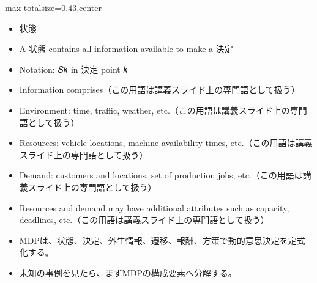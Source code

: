 \clearpage
{}
\begin{minipage}[t]{0.405\textwidth}
\begin{adjustbox}{max totalsize={\textwidth}{0.43\textheight},center}
\begin{minipage}{\textwidth}\scriptsize
{}\begin{itemize}
\item 状態
\item A 状態 contains all information available to make a 決定
\item Notation: 𝑆𝑘 in 決定 point 𝑘
\item Information comprises（この用語は講義スライド上の専門語として扱う）
\item Environment: time, traffic, weather, etc.（この用語は講義スライド上の専門語として扱う）
\item Resources: vehicle locations, machine availability times, etc.（この用語は講義スライド上の専門語として扱う）
\item Demand: customers and locations, set of production jobs, etc.（この用語は講義スライド上の専門語として扱う）
\item Resources and demand may have additional attributes such as capacity, deadlines, etc.（この用語は講義スライド上の専門語として扱う）
\end{itemize}\begin{itemize}
\item MDPは、状態、決定、外生情報、遷移、報酬、方策で動的意思決定を定式化する。
\item 未知の事例を見たら、まずMDPの構成要素へ分解する。
\end{itemize}
\end{minipage}
\end{adjustbox}
\end{minipage}\hfill
